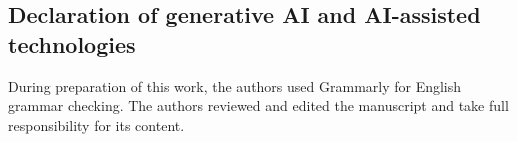 \documentclass[12pt,a4paper]{article}
\begin{document}
\subsection*{Declaration of generative AI and AI-assisted technologies}
During preparation of this work, the authors used Grammarly for English grammar checking. The authors reviewed and edited the manuscript and take full responsibility for its content.



\end{document}
